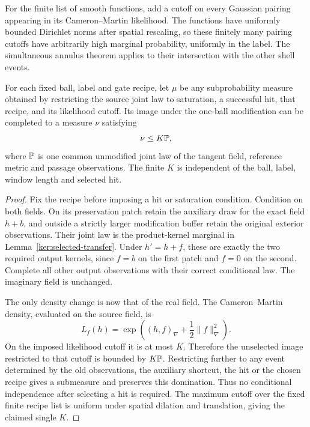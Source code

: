 For the finite list of smooth functions, add a cutoff on every
Gaussian pairing appearing in its Cameron--Martin likelihood.  The
functions have uniformly bounded Dirichlet norms after spatial
rescaling, so these finitely many pairing cutoffs have arbitrarily
high marginal probability, uniformly in the label.  The simultaneous
annulus theorem applies to their intersection with the other shell
events.

\begin{lemma}
\label{met:transfer-dominance}
For each fixed ball, label and gate recipe, let $\mu$ be any
subprobability measure obtained by restricting the source joint law
to saturation, a successful hit, that recipe, and its likelihood
cutoff.  Its image under the one-ball modification can be completed
to a measure $\nu$ satisfying
\begin{equation}
 \nu\leq K\PP,
 \label{met:domination}
\end{equation}
where $\mathbb P$ is one common unmodified joint law of the tangent field,
reference metric and passage observations.  The finite $K$ is
independent of the ball, label, window length and selected hit.
\end{lemma}

\begin{proof}
Fix the recipe before imposing a hit or saturation condition.
Condition on both fields.  On its preservation patch retain the
auxiliary draw for the exact field $h+b$, and outside a strictly
larger modification buffer retain the original exterior observations.
Their joint law is the product-kernel marginal in
Lemma~\ref{ker:selected-transfer}.  Under $h'=h+f$, these are
exactly the two required output kernels, since $f=b$ on the first
patch and $f=0$ on the second.  Complete all other output observations
with their correct conditional law.  The imaginary field is unchanged.

The only density change is now that of the real field.  The
Cameron--Martin density, evaluated on the source field, is
\[
 L_f(h)=\exp\left((h,f)_\nabla+\frac12\|f\|_\nabla^2\right).
\]
On the imposed likelihood cutoff it is at most $K$.  Therefore the
unselected image restricted to that cutoff is bounded by $K\mathbb P$.
Restricting further to any event determined by the old observations,
the auxiliary shortcut, the hit or the chosen recipe gives a
submeasure and preserves this domination.  Thus no conditional
independence after selecting a hit is required.  The maximum cutoff
over the fixed finite recipe list is uniform under spatial dilation
and translation, giving the claimed single $K$.
\end{proof}


